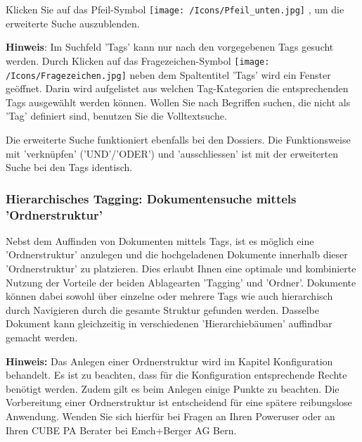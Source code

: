 Klicken Sie auf das Pfeil-Symbol \texttt{[image: /Icons/Pfeil\_unten.jpg]} , um die erweiterte Suche auszublenden.

\vspace{\baselineskip}

\textbf{Hinweis}: Im Suchfeld 'Tags' kann nur nach den vorgegebenen Tags gesucht werden. Durch Klicken auf das Fragezeichen-Symbol \texttt{[image: /Icons/Fragezeichen.jpg]} neben dem Spaltentitel 'Tags' wird ein Fenster geöffnet. Darin wird aufgelistet aus welchen Tag-Kategorien die entsprechenden Tags ausgewählt werden können. Wollen Sie nach Begriffen suchen, die nicht als 'Tag' definiert sind, benutzen Sie die Volltextsuche.

\vspace{\baselineskip}

Die erweiterte Suche funktioniert ebenfalls bei den Dossiers. Die Funktionsweise mit 'verknüpfen' ('UND'/'ODER') und 'ausschliessen' ist mit der erweiterten Suche bei den Tags identisch.

\subsubsection{Hierarchisches Tagging: Dokumentensuche mittels 'Ordnerstruktur'}

Nebst dem Auffinden von Dokumenten mittels Tags, ist es möglich eine 'Ordnerstruktur' anzulegen und die hochgeladenen Dokumente innerhalb dieser 'Ordnerstruktur' zu platzieren. Dies erlaubt Ihnen eine optimale und kombinierte Nutzung der Vorteile der beiden Ablagearten 'Tagging' und 'Ordner'. Dokumente können dabei sowohl über einzelne oder mehrere Tags wie auch hierarchisch durch Navigieren durch die gesamte Struktur gefunden werden. Dasselbe Dokument kann gleichzeitig in verschiedenen 'Hierarchiebäumen' auffindbar gemacht werden.

\vspace{\baselineskip}

\textbf{Hinweis:} Das Anlegen einer Ordnerstruktur wird im Kapitel Konfiguration behandelt. Es ist zu beachten, dass für die Konfiguration entsprechende Rechte benötigt werden. Zudem gilt es beim Anlegen einige Punkte zu beachten. Die Vorbereitung einer Ordnerstruktur ist entscheidend für eine spätere reibungslose Anwendung. Wenden Sie sich hierfür bei Fragen an Ihren Poweruser oder an Ihren CUBE PA Berater bei Emch+Berger AG Bern.

\vspace{\baselineskip}


